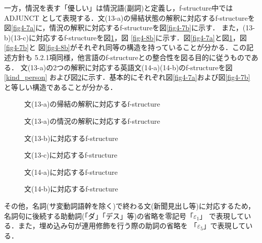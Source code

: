 \vspace{6mm}
一方，情況を表す「優しい」は情況語(副詞)と定義し，f-structure中では
ADJUNCT として表現する．文(13-a)の帰結状態の解釈に対応するf-structureを
図\ref{fig4-7a}に，情況の解釈に対応するf-structureを図\ref{fig4-7b}に示す．
また，(13-b)(13-c)に対応するf-structureを図\ref{fig4-8a}，図
\ref{fig4-8b}に示す．図\ref{fig4-7a}と図\ref{fig4-8a}，図\ref{fig4-7b}と
図\ref{fig4-8b}がそれぞれ同等の構造を持っていることが分かる．この記述方針も
5.2.1項同様，他言語のf-structureとの整合性を図る目的に従うものである．
文(13-a)の2つの解釈に対応する英語文(14-a)(14-b)のf-structureを図\ref{kind_person}
および図\ref{kindly}に示す．基本的にそれぞれ図\ref{fig4-7a}および図\ref{fig4-7b}
と等しい構造であることが分かる．

\begin{figure}[htbp]
\vspace{-3mm}
\center
\epsfxsize=72mm
\caption{文(13-a)の帰結の解釈に対応するf-structure}
\label{fig4-7a}

\center
\epsfxsize=72mm
\caption{文(13-a)の情況の解釈に対応するf-structure}
\label{fig4-7b}

\center
\epsfxsize=72mm
\caption{文(13-b)に対応するf-structure}
\label{fig4-8a}
\end{figure}

\begin{figure}[htbp]
\center
\epsfxsize=75mm
\caption{文(13-c)に対応するf-structure}
\label{fig4-8b}

\center
\epsfxsize=120mm
\caption{文(14-a)に対応するf-structure}
\label{kind_person}

\center
\epsfxsize=75mm
\caption{文(14-b)に対応するf-structure}
\label{kindly}
\end{figure}

その他，名詞(サ変動詞語幹を除く)で終わる文(新聞見出し等)に対応するため，
名詞句に後続する助動詞(「ダ」「デス」等)の省略を零記号「$\varepsilon_1$」
で表現している．また，埋め込み句が連用修飾を行う際の助詞の省略を
「$\varepsilon_5$」で表現している．
\vspace{3mm}

